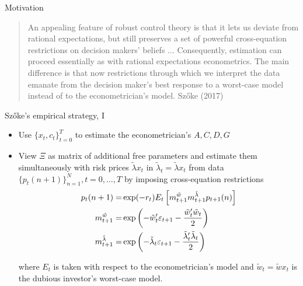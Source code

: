 \documentclass{beamer}
\theoremstyle{Definition}
\begin{document}
\begin{frame}{Motivation}
 \begin{quote}
  An appealing feature of robust control theory is that it lets us deviate from
  rational expectations, but still  preserves a set of powerful cross-equation restrictions on  decision makers'
  beliefs $\ldots$ %
    Consequently,
  estimation  can proceed essentially as with
  rational expectations econometrics.  The main difference is that now  restrictions through which we
  interpret the data emanate from the decision maker's best response to a  worst-case model instead of to the
  econometrician's model. \quad Sz\H{o}ke (2017)
 \end{quote}



\end{frame}



\begin{frame}{Sz\H{o}ke's empirical strategy, I}
\begin{itemize}
\item Use $\{x_t, c_t\}_{t=0}^T$ to estimate the econometrician's $A, C, D, G$
\item View $\Xi$ as matrix of additional free parameters and estimate them simultaneously with  risk prices  $\tilde \lambda x_t$
in $\tilde \lambda_t = \tilde \lambda x_t$ from  data $\{p_t(n+1)\}_{n=1}^N, t=0, \ldots, T$ by imposing  cross-equation restrictions
\begin{align*}
p_t(n+1) = & \exp(- r_t) E_t \left[ m_{t+1}^{\tilde w} m_{t+1}^{\tilde \lambda}   p_{t+1}(n) \right] \\
m_{t+1}^{\tilde w}  = & \exp \left(
- \tilde w_t' \varepsilon_{t+1} - \frac{\tilde w_t'
\tilde w_t}{2} \right)  \cr
m_{t+1}^{\tilde \lambda}  = & \exp\left(- \tilde \lambda_t \varepsilon_{t+1} - \frac{\tilde \lambda_t' \tilde \lambda_t}{2} \right)
\end{align*}

where $E_t$ is taken with respect to the econometrician's  model and
 $ \tilde w_t = \tilde  w x_t$ is the dubious investor's worst-case model.
\end{itemize}
\end{frame}
\end{document}
